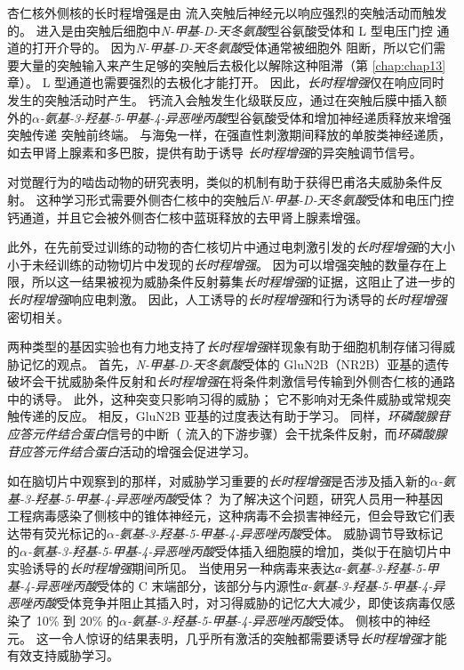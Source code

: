 杏仁核外侧核的长时程增强是由  流入突触后神经元以响应强烈的突触活动而触发的。
 进入是由突触后细胞中\textit{N-甲基-D-天冬氨酸}型谷氨酸受体和 L 型电压门控  通道的打开介导的。
因为\textit{N-甲基-D-天冬氨酸}受体通常被细胞外  阻断，所以它们需要大量的突触输入来产生足够的突触后去极化以解除这种阻滞（第 \ref{chap:chap13} 章）。
L 型通道也需要强烈的去极化才能打开。 因此，\textit{长时程增强}仅在响应同时发生的突触活动时产生。
钙流入会触发生化级联反应，通过在突触后膜中插入额外的\textit{$\alpha$-氨基-3-羟基-5-甲基-4-异恶唑丙酸}型谷氨酸受体和增加神经递质释放来增强突触传递 突触前终端。
与海兔一样，在强直性刺激期间释放的单胺类神经递质，如去甲肾上腺素和多巴胺，提供有助于诱导 \textit{长时程增强}的异突触调节信号。


对觉醒行为的啮齿动物的研究表明，类似的机制有助于获得巴甫洛夫威胁条件反射。
这种学习形式需要外侧杏仁核中的突触后\textit{N-甲基-D-天冬氨酸}受体和电压门控钙通道，并且它会被外侧杏仁核中蓝斑释放的去甲肾上腺素增强。


此外，在先前受过训练的动物的杏仁核切片中通过电刺激引发的\textit{长时程增强}的大小小于未经训练的动物切片中发现的\textit{长时程增强}。
因为可以增强突触的数量存在上限，所以这一结果被视为威胁条件反射募集\textit{长时程增强}的证据，这阻止了进一步的\textit{长时程增强}响应电刺激。
因此，人工诱导的\textit{长时程增强}和行为诱导的\textit{长时程增强}密切相关。


两种类型的基因实验也有力地支持了\textit{长时程增强}样现象有助于细胞机制存储习得威胁记忆的观点。
首先，\textit{N-甲基-D-天冬氨酸}受体的 GluN2B（NR2B）亚基的遗传破坏会干扰威胁条件反射和\textit{长时程增强}在将条件刺激信号传输到外侧杏仁核的通路中的诱导。
此外，这种突变只影响习得的威胁；
它不影响对无条件威胁或常规突触传递的反应。
相反，GluN2B 亚基的过度表达有助于学习。 同样，\textit{环磷酸腺苷应答元件结合蛋白}信号的中断（ 流入的下游步骤）会干扰条件反射，而\textit{环磷酸腺苷应答元件结合蛋白}活动的增强会促进学习。


如在脑切片中观察到的那样，对威胁学习重要的\textit{长时程增强}是否涉及插入新的\textit{$\alpha$-氨基-3-羟基-5-甲基-4-异恶唑丙酸}受体？
为了解决这个问题，研究人员用一种基因工程病毒感染了侧核中的锥体神经元，这种病毒不会损害神经元，但会导致它们表达带有荧光标记的\textit{$\alpha$-氨基-3-羟基-5-甲基-4-异恶唑丙酸}受体。
威胁调节导致标记的\textit{$\alpha$-氨基-3-羟基-5-甲基-4-异恶唑丙酸}受体插入细胞膜的增加，类似于在脑切片中实验诱导的\textit{长时程增强}期间所见。
当使用另一种病毒来表达\textit{α-氨基-3-羟基-5-甲基-4-异恶唑丙酸}受体的 C 末端部分，该部分与内源性\textit{α-氨基-3-羟基-5-甲基-4-异恶唑丙酸}受体竞争并阻止其插入时，对习得威胁的记忆大大减少，即使该病毒仅感染了 10\% 到 20\% 的\textit{$\alpha$-氨基-3-羟基-5-甲基-4-异恶唑丙酸}受体。
侧核中的神经元。 这一令人惊讶的结果表明，几乎所有激活的突触都需要诱导\textit{长时程增强}才能有效支持威胁学习。


